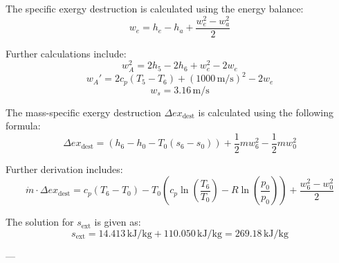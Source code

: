 The specific exergy destruction is calculated using the energy balance:  
\[
w_e = h_e - h_a + \frac{w_e^2 - w_a^2}{2}
\]  

Further calculations include:  
\[
w_A^2 = 2h_5 - 2h_6 + w_e^2 - 2w_e
\]  
\[
w_A' = 2c_p (T_5 - T_6) + (1000 \, \text{m/s})^2 - 2w_e
\]  
\[
w_s = 3.16 \, \text{m/s}
\]

The mass-specific exergy destruction \( \Delta ex_{\text{dest}} \) is calculated using the following formula:  
\[
\Delta ex_{\text{dest}} = (h_6 - h_0 - T_0(s_6 - s_0)) + \frac{1}{2} m w_6^2 - \frac{1}{2} m w_0^2
\]  

Further derivation includes:  
\[
\dot{m} \cdot \Delta ex_{\text{dest}} = c_p(T_6 - T_0) - T_0 \left( c_p \ln \left( \frac{T_6}{T_0} \right) - R \ln \left( \frac{p_0}{p_0} \right) \right) + \frac{w_6^2 - w_0^2}{2}
\]  

The solution for \( s_{\text{ext}} \) is given as:  
\[
s_{\text{ext}} = 14.413 \, \text{kJ/kg} + 110.050 \, \text{kJ/kg} = 269.18 \, \text{kJ/kg}
\]  

---